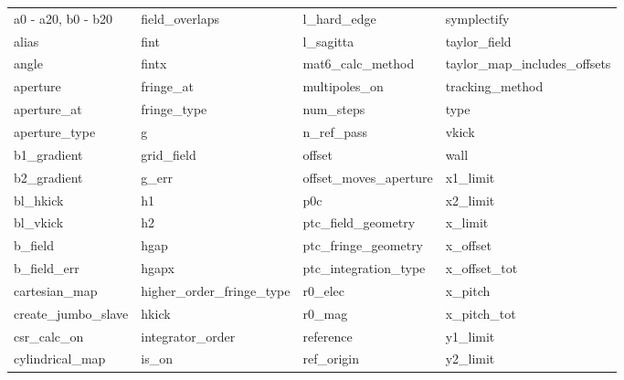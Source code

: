  \begin{tabular}{llll} \toprule
a0 - a20, b0 - b20          & field_overlaps              & l_hard_edge                 & symplectify                 \\
alias                       & fint                        & l_sagitta                   & taylor_field                \\
angle                       & fintx                       & mat6_calc_method            & taylor_map_includes_offsets \\
aperture                    & fringe_at                   & multipoles_on               & tracking_method             \\
aperture_at                 & fringe_type                 & num_steps                   & type                        \\
aperture_type               & g                           & n_ref_pass                  & vkick                       \\
b1_gradient                 & grid_field                  & offset                      & wall                        \\
b2_gradient                 & g_err                       & offset_moves_aperture       & x1_limit                    \\
bl_hkick                    & h1                          & p0c                         & x2_limit                    \\
bl_vkick                    & h2                          & ptc_field_geometry          & x_limit                     \\
b_field                     & hgap                        & ptc_fringe_geometry         & x_offset                    \\
b_field_err                 & hgapx                       & ptc_integration_type        & x_offset_tot                \\
cartesian_map               & higher_order_fringe_type    & r0_elec                     & x_pitch                     \\
create_jumbo_slave          & hkick                       & r0_mag                      & x_pitch_tot                 \\
csr_calc_on                 & integrator_order            & reference                   & y1_limit                    \\
cylindrical_map             & is_on                       & ref_origin                  & y2_limit                    \\

\end{tabular}
